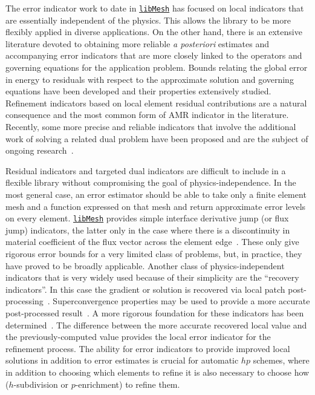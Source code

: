 \documentclass[global,twocolumn,final]{svjour}
\newcommand{\libMesh}{\href{http://libmesh.sourceforge.net}{\texttt{lib\-Mesh}}}
\newcommand{\dealII}{\href{http://www.dealii.org}{\texttt{deal.\-II}}}
\begin{document}
The error indicator work to date in \libMesh{} has focused on local
indicators that are essentially independent of the physics.  This
allows the library to be more flexibly applied in diverse applications.  On
the other hand, there is an extensive literature devoted to
obtaining more reliable \emph{a posteriori} estimates and accompanying
error indicators that are more closely linked to the operators and
governing equations for the application problem.  Bounds relating the
global error in energy to residuals with respect to the approximate
solution and governing equations have been developed and their
properties extensively studied.  Refinement indicators based on local
element residual contributions are a natural consequence and the most
common form of AMR indicator in the literature.  Recently, some more
precise and reliable indicators that involve the additional work of
solving a related dual problem have been proposed and are the subject
of ongoing
research~\cite{Bangerth2003,eriksson_1996,estep_2000,estep_2002,estep_2005}.

Residual indicators and targeted dual
indicators are difficult to include in a flexible library without 
compromising the goal of physics-independence.  In the most general
case, an error estimator should be able to take only a finite element
mesh and a function expressed on that mesh and return approximate
error levels on every element.  \libMesh{} provides simple
interface derivative jump (or flux jump) indicators, the latter only
in the case where there is a discontinuity in material coefficient of
the flux vector across the element edge~\cite{kelly_error_1983}.
These only give rigorous error bounds for a very limited class of
problems, but, in practice, they have proved to be broadly applicable.
Another class of physics-independent indicators that is very widely
used because of their simplicity are the ``recovery indicators''.  In
this case the gradient or solution is recovered via local patch
post-processing~\cite{ZZ87}.  Superconvergence properties may be used
to provide a more accurate post-processed
result~\cite{wahlbin_superconvergence}.
A more rigorous foundation for these indicators has been
determined~\cite{varis_thesis}.
The difference between the more accurate
recovered local value and the previously-computed value provides the
local error indicator for the refinement process.  The ability for
error indicators to provide improved local solutions in addition to
error estimates is crucial for automatic $hp$ schemes, where in
addition to choosing which elements to refine it is also necessary to
choose how ($h$-subdivision or $p$-enrichment) to refine them.
\end{document}
